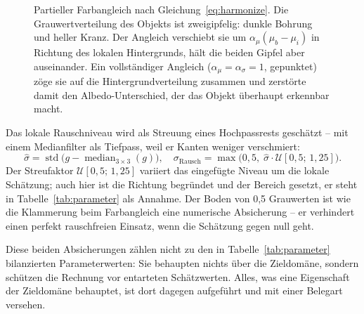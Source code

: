 \begin{figure}[htbp]
\caption[Partieller Farbangleich]{Partieller Farbangleich nach
Gleichung~\eqref{eq:harmonize}. Die Grauwertverteilung des Objekts ist
zweigipfelig: dunkle Bohrung und heller Kranz. Der Angleich verschiebt sie um
$\alpha_\mu(\mu_b - \mu_i)$ in Richtung des lokalen Hintergrunds, hält die
beiden Gipfel aber auseinander. Ein vollständiger Angleich
($\alpha_\mu = \alpha_\sigma = 1$, gepunktet) zöge sie auf die
Hintergrundverteilung zusammen und zerstörte damit den Albedo-Unterschied, der
das Objekt überhaupt erkennbar macht.}
\label{abb:farbangleich}
\end{figure}

 Das lokale Rauschniveau wird als Streuung eines
Hochpassrests geschätzt \parencite[vgl.][]{immerkaer1996} -- mit einem
Medianfilter als Tiefpass, weil er Kanten weniger verschmiert:
\begin{equation}
\hat{\sigma} = \operatorname{std}\!\big(g - \operatorname{median}_{3\times3}(g)\big),
\quad
\sigma_{\text{Rausch}} = \max\!\big(0{,}5,\; \hat{\sigma} \cdot
\mathcal{U}[0{,}5;\,1{,}25]\big).
\label{eq:noise}
\end{equation}
Der Streufaktor $\mathcal{U}[0{,}5;\,1{,}25]$ variiert das eingefügte Niveau um
die lokale Schätzung; auch hier ist die Richtung begründet und der Bereich
gesetzt, er steht in Tabelle~\ref{tab:parameter} als Annahme. Der Boden von
0,5 Grauwerten ist wie die Klammerung beim Farbangleich eine numerische
Absicherung -- er verhindert einen perfekt rauschfreien Einsatz, wenn die
Schätzung gegen null geht.

Diese beiden Absicherungen zählen nicht zu den in Tabelle~\ref{tab:parameter}
bilanzierten Parameterwerten: Sie behaupten nichts über die Zieldomäne, sondern
schützen die Rechnung vor entarteten Schätzwerten. Alles, was eine Eigenschaft
der Zieldomäne behauptet, ist dort dagegen aufgeführt und mit einer Belegart
versehen.

\iffalse

